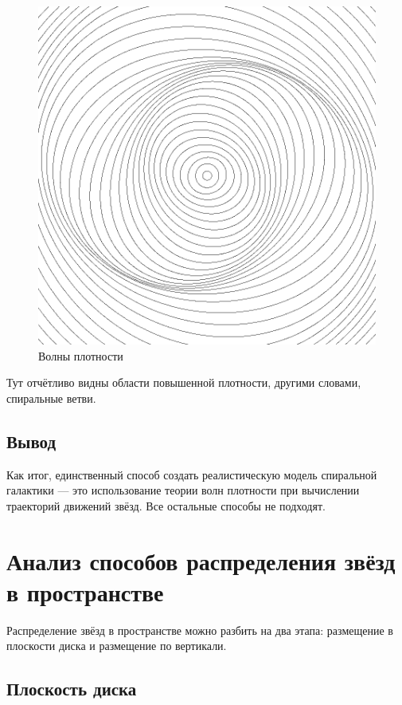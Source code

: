 \begin{figure}[H]
    \centering
    \includegraphics[scale=0.4]{image/densitywaves.png}
    \caption{Волны плотности}
    \label{img:densitywaves}
\end{figure}

Тут отчётливо видны области повышенной плотности, другими словами, спиральные ветви.

\subsection{Вывод}

Как итог, единственный способ создать реалистическую модель спиральной галактики — это использование теории волн плотности при вычислении траекторий движений звёзд. Все остальные способы не подходят.

\section{Анализ способов распределения звёзд в пространстве}

Распределение звёзд в пространстве можно разбить на два этапа: размещение в плоскости диска и размещение по вертикали.

\subsection{Плоскость диска}

